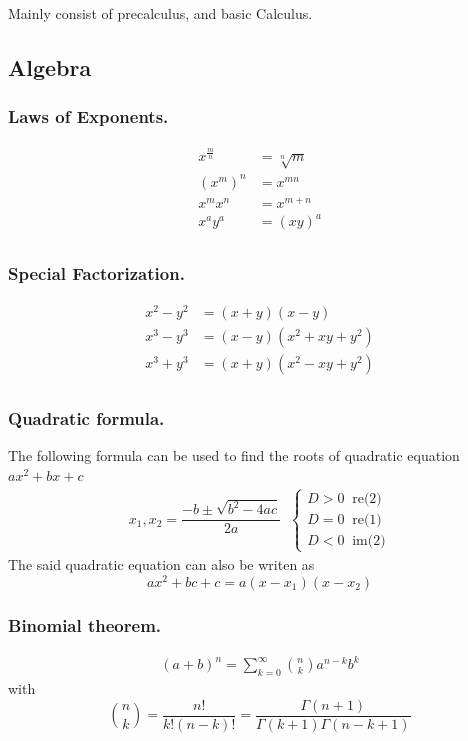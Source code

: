 \documentclass[../../../main.tex]{subfiles}
\begin{document}
Mainly consist of precalculus, and basic Calculus.
\subsection{Algebra}
\subsubsection{Laws of Exponents.}
\begin{align*}
    x^{\tfrac{m}{n}}&=\sqrt[n]{m}\\
    (x^m)^n&=x^{mn}\\
    x^mx^n&=x^{m+n}\\
    x^ay^a&=(xy)^a\\
\end{align*}

\subsubsection{Special Factorization.}
\begin{align*}
    x^2-y^2&=(x+y)(x-y)\\
    x^3-y^3&=(x-y)(x^2+xy+y^2)\\
    x^3+y^3&=(x+y)(x^2-xy+y^2)\\
\end{align*}

\subsubsection{Quadratic formula.} The following formula can be used to find the roots of quadratic equation $ax^2+bx+c$
\begin{align*}
    x_1,x_2=\dfrac{-b\pm \sqrt{b^2-4ac}}{2a}\;\;
    \begin{cases}
        D>0 \;\;\text{re(2)}\\
        D=0\;\;\text{re(1)}\\
        D<0\;\;\text{im(2)}
    \end{cases}
\end{align*}
The said quadratic equation can also be writen as 
\begin{equation*}
    ax^2+bc+c=a(x-x_1)(x-x_2)
\end{equation*}

\subsubsection{Binomial theorem.}
\begin{align*}
    (a+b)^n=\sum_{k=0}^{\infty}\binom{n}{k}a^{n-k}b^{k}
\end{align*}
with
\begin{equation*}
    \binom{n}{k} = \frac{n!}{k!(n-k)!}=\frac{\Gamma (n+1)}{\Gamma(k+1)\Gamma(n-k+1)}
\end{equation*}
\end{document}
